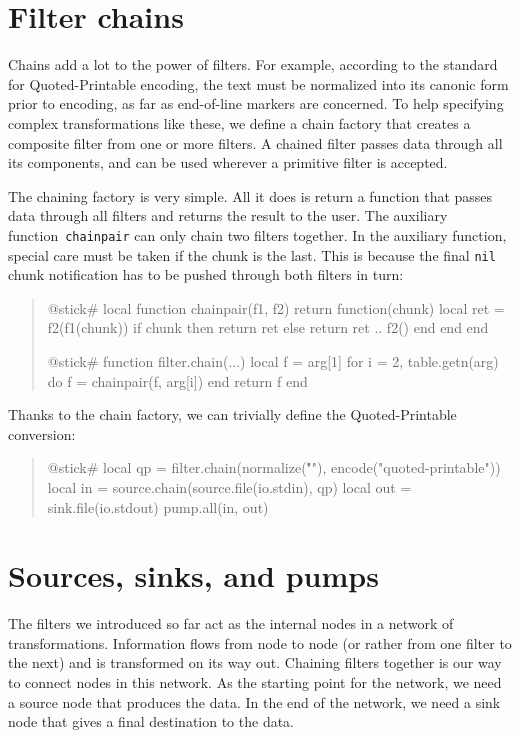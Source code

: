 \documentclass[10pt]{article}
\begin{document}
\section{Filter chains}

Chains add a lot to the power of filters.  For example,
according to the standard for Quoted-Printable encoding, the
text must be normalized into its canonic form prior to
encoding, as far as end-of-line markers are concerned.  To
help specifying complex transformations like these, we define a
chain factory that creates a composite filter from one or
more filters.  A chained filter passes data through all
its components, and can be used wherever a primitive filter
is accepted.

The chaining factory is very simple. All it does is return a
function that passes data through all filters and returns
the result to the user.  The auxiliary
function~\texttt{chainpair} can only chain two filters
together. In the auxiliary function, special care must be
taken if the chunk is the last. This is because the final
\texttt{nil} chunk notification has to be pushed through both
filters in turn:  
\begin{quote}
\begin{lua}
@stick#
local function chainpair(f1, f2)
  return function(chunk)
    local ret = f2(f1(chunk))
    if chunk then return ret
    else return ret .. f2() end
  end
end
%

@stick#
function filter.chain(...)
  local f = arg[1]
  for i = 2, table.getn(arg) do
    f = chainpair(f, arg[i])
  end
  return f
end
%
\end{lua}
\end{quote}

Thanks to the chain factory, we can
trivially define the Quoted-Printable conversion:
\begin{quote}
\begin{lua}
@stick#
local qp = filter.chain(normalize("\r\n"), 
  encode("quoted-printable"))
local in = source.chain(source.file(io.stdin), qp)
local out = sink.file(io.stdout)
pump.all(in, out)
%
\end{lua}
\end{quote}

\section{Sources, sinks, and pumps}

The filters we introduced so far act as the internal nodes
in a network of transformations. Information flows from node
to node (or rather from one filter to the next) and is
transformed on its way out. Chaining filters together is our
way to connect nodes in this network. As the starting point
for the network, we need a source node that produces the
data. In the end of the network, we need a sink node that
gives a final destination to the data.
\end{document}
